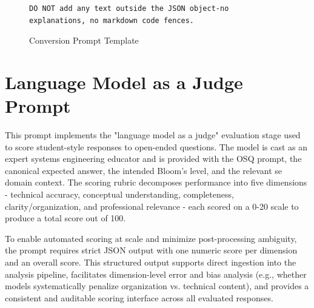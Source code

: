 \begin{figure}[htbp]
\begin{scriptsize}
\begin{lstlisting}
DO NOT add any text outside the JSON object-no explanations, no markdown code fences.

\end{lstlisting}
\end{scriptsize}
\caption{Conversion Prompt Template}
\label{app:converter_prompt_template}
\end{figure}


\clearpage

\section{Language Model as a Judge Prompt}
\label{app:llm-as-a-judge-prompt}

This prompt implements the "language model as a judge" evaluation stage used to score student-style responses to open-ended questions. The model is cast as an expert systems engineering educator and is provided with the OSQ prompt, the canonical expected answer, the intended Bloom’s level, and the relevant \ac{se} domain context. The scoring rubric decomposes performance into five dimensions - technical accuracy, conceptual understanding, completeness, clarity/organization, and professional relevance - each scored on a 0-20 scale to produce a total score out of 100.

To enable automated scoring at scale and minimize post-processing ambiguity, the prompt requires strict JSON output with one numeric score per dimension and an overall score. This structured output supports direct ingestion into the analysis pipeline, facilitates dimension-level error and bias analysis (e.g., whether models systematically penalize organization vs. technical content), and provides a consistent and auditable scoring interface across all evaluated responses.

